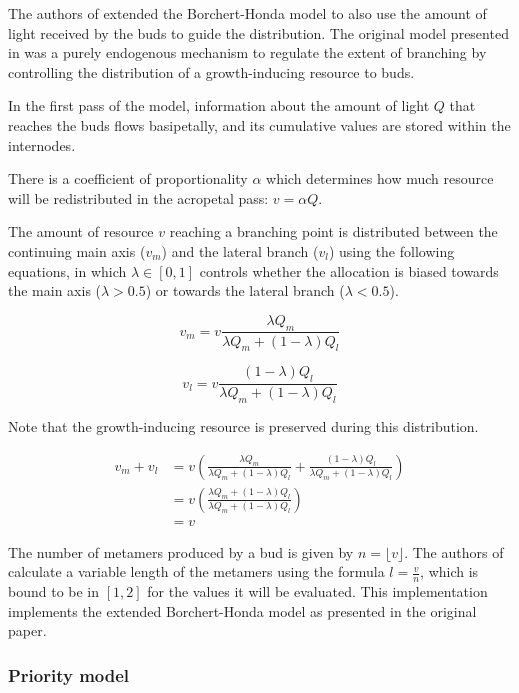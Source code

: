 \documentclass{article}
\begin{document}
The authors of \cite{Palubicki2009} extended the Borchert-Honda model to also use the amount of light received by the buds to guide the distribution.
The original model presented in \cite{Borchert1984} was a purely endogenous mechanism to regulate the extent of branching by controlling the distribution of a growth-inducing resource to buds.

In the first pass of the model, information about the amount of light \(Q\) that reaches the buds flows basipetally, and its cumulative values are stored within the internodes.

There is a coefficient of proportionality \(\alpha\) which determines how much resource will be redistributed in the acropetal pass: \(v = \alpha Q\).

The amount of resource \(v\) reaching a branching point is distributed between the continuing main axis (\(v_m\)) and the lateral branch (\(v_l\)) using the following equations, in which \(\lambda \in [0, 1]\) controls whether the allocation is biased towards the main axis (\(\lambda > 0.5\)) or towards the lateral branch (\(\lambda < 0.5\)).

\[v_m = v \frac{\lambda Q_m}{\lambda Q_m + (1 - \lambda)Q_l}\]

\[v_l = v \frac{(1 - \lambda) Q_l}{\lambda Q_m + (1 - \lambda)Q_l}\]

Note that the growth-inducing resource is preserved during this distribution.

\begin{align*}
v_m + v_l &= v \left(\frac{\lambda Q_m}{\lambda Q_m + (1 - \lambda)Q_l} + \frac{(1 - \lambda) Q_l}{\lambda Q_m + (1 - \lambda)Q_l}\right) \\
          &= v \left(\frac{\lambda Q_m + (1 - \lambda) Q_l}{\lambda Q_m + (1 - \lambda)Q_l}\right) \\
          &= v
\end{align*}

The number of metamers produced by a bud is given by \(n = \lfloor v \rfloor\). The authors of \cite{Palubicki2009} calculate a variable length of the metamers using the formula \(l = \frac{v}{n}\), which is bound to be in \([1, 2]\) for the values it will be evaluated.
This implementation implements the extended Borchert-Honda model as presented in the original paper.

\subsubsection{Priority model}
\end{document}
